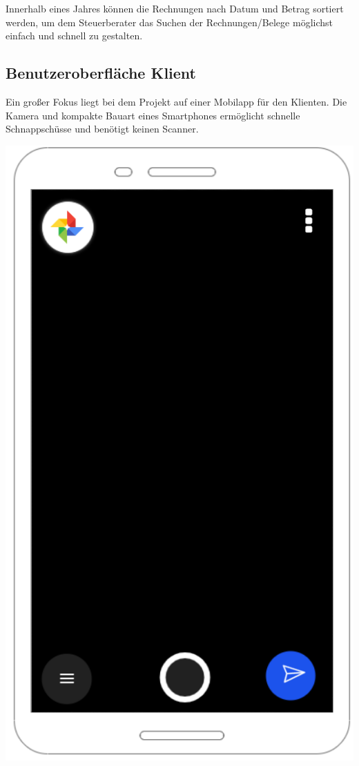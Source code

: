 \documentclass[12pt]{article}
\theoremstyle{definition}
\begin{document}
\noindent Innerhalb eines Jahres können die Rechnungen nach Datum und Betrag sortiert werden, um dem Steuerberater das Suchen der Rechnungen/Belege möglichst einfach und schnell zu gestalten.
\par

\pagebreak
\subsection{Benutzeroberfläche Klient}
Ein großer Fokus liegt bei dem Projekt auf einer Mobilapp für den Klienten. Die Kamera und kompakte Bauart eines Smartphones ermöglicht schnelle Schnappschüsse und benötigt keinen Scanner.

\includegraphics[scale=0.5]{MobileSnapshotReceiptConcept}
\end{document}
